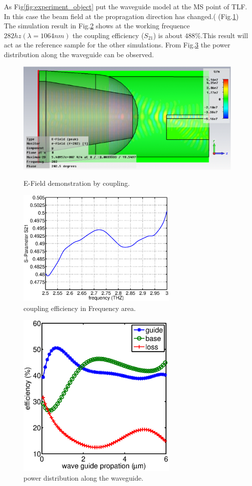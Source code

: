 As Fig\ref{fig:experiment_object} put  the  waveguide model at the MS point of TLF. In this case the beam field at the propragation direction has changed.( (Fig.\ref{fig:coupling_e_field}) The simulation result in Fig.\ref{fig:orignial_coupling_efficiency} shows at the working frequence $282hz(\lambda=1064 nm)$ the coupling efficiency ($S_{21}$) is about $488\%$.This result will act as the reference sample for the other simulations. From Fig.\ref{fig:power_distribution} the power distribution along the waveguide can be observed. 
\begin{figure}[!ht]
\centering
	\includegraphics[width=0.5 \textwidth]{bilder/basic_waveguide_efield}
	\label{fig:coupling_e_field}
	\caption{E-Field demonstration by  coupling.}
\end{figure}
\begin{figure}
\centering
\includegraphics[width=0.7\textwidth]{bilder/original_coupling_efficiency}
\caption{coupling efficiency in Frequency area.}
\label{fig:orignial_coupling_efficiency}
\end{figure}

\begin{figure}[!ht]
\centering
\includegraphics[width=0.7\textwidth]{bilder/power_distribution}
\caption{power distribution along the waveguide.}
\label{fig:power_distribution}
\end{figure}

